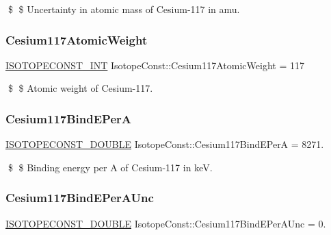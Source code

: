 \$ \$ Uncertainty in atomic mass of Cesium-\/117 in amu. \mbox{\label{group___isotope_const-_cesium-_cs117_ga83df658dd9c24e2e1a1c1ade3ed6a693}} 
\subsubsection{\texorpdfstring{Cesium117\+Atomic\+Weight}{Cesium117AtomicWeight}}
{\footnotesize\ttfamily \mbox{\hyperlink{group___isotope_const-_macros_ga5f18360b3e99483a35c32d789e62621c}{I\+S\+O\+T\+O\+P\+E\+C\+O\+N\+S\+T\+\_\+\+I\+NT}} Isotope\+Const\+::\+Cesium117\+Atomic\+Weight = 117}

\$ \$ Atomic weight of Cesium-\/117. \mbox{\label{group___isotope_const-_cesium-_cs117_ga9794fb2954e90096a767902222c78778}} 
\subsubsection{\texorpdfstring{Cesium117\+Bind\+E\+PerA}{Cesium117BindEPerA}}
{\footnotesize\ttfamily \mbox{\hyperlink{group___isotope_const-_macros_ga8f45a7272ce02c0b4c65c44636ed719a}{I\+S\+O\+T\+O\+P\+E\+C\+O\+N\+S\+T\+\_\+\+D\+O\+U\+B\+LE}} Isotope\+Const\+::\+Cesium117\+Bind\+E\+PerA = 8271.}

\$ \$ Binding energy per A of Cesium-\/117 in keV. \mbox{\label{group___isotope_const-_cesium-_cs117_gad18284428b7766e28946b731c677ed49}} 
\subsubsection{\texorpdfstring{Cesium117\+Bind\+E\+Per\+A\+Unc}{Cesium117BindEPerAUnc}}
{\footnotesize\ttfamily \mbox{\hyperlink{group___isotope_const-_macros_ga8f45a7272ce02c0b4c65c44636ed719a}{I\+S\+O\+T\+O\+P\+E\+C\+O\+N\+S\+T\+\_\+\+D\+O\+U\+B\+LE}} Isotope\+Const\+::\+Cesium117\+Bind\+E\+Per\+A\+Unc = 0.}

